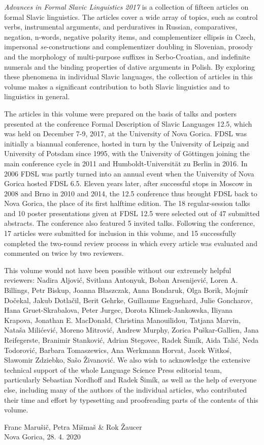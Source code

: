 
\textit{Advances in Formal Slavic Linguistics 2017} is a collection of fifteen articles on formal Slavic linguistics. The articles cover a wide array of topics, such as control verbs, instrumental arguments, and perduratives in Russian, comparatives, negation, n-words, negative polarity items, and complementizer ellipsis in Czech, impersonal \textit{se}-constructions and complementizer doubling in Slovenian, prosody and the morphology of multi-purpose suffixes in Serbo-Croatian, and indefinite numerals and the binding properties of dative arguments in Polish. By exploring these phenomena in individual Slavic languages, the collection of articles in this volume makes a significant contribution to both Slavic linguistics and to linguistics in general.

The articles in this volume were prepared on the basis of talks and posters presented at the conference Formal Description of Slavic Languages 12.5, which was held on December 7-9, 2017, at the University of Nova Gorica. FDSL was initially a biannual conference, hosted in turn by the University of Leipzig and University of Potsdam since 1995, with the University of Göttingen joining the main conference cycle in 2011 and Humboldt-Universität zu Berlin in 2016. In 2006 FDSL was partly turned into an annual event when the University of Nova Gorica hosted FDSL 6.5. Eleven years later, after successful stops in Moscow in 2008 and Brno in 2010 and 2014, the 12.5 conference thus brought FDSL back to Nova Gorica, the place of its first halftime edition. The 18 regular-session talks and 10 poster presentations given at FDSL 12.5 were selected out of 47 submitted abstracts. The conference also featured 5 invited talks. Following the conference, 17 articles were submitted for inclusion in this volume, and 15 successfully completed the two-round review process in which every article was evaluated and commented on twice by two reviewers.

This volume would not have been possible without our extremely helpful reviewers: Nadira Aljović, Svitlana Antonyuk, Boban Arsenijević, Loren A. Billings, Petr Biskup, Joanna Błaszczak, Anna Bondaruk, Olga Borik, Mojmír Dočekal, Jakub Dotlačil, Berit Gehrke, Guillaume Enguehard, Julie Goncharov, Hana Gruet-Skrabalova, Peter Jurgec, Dorota Klimek-Jankowska, Iliyana Krapova, Jonathan E. MacDonald, Christina Manouilidou, Tatjana Marvin, Nataša Milićević, Moreno Mitrović, Andrew Murphy, Zorica Puškar-Gallien, Jana Reifegerste, Branimir Stan\-ković, Adrian Stegovec, Radek Šimík, Aida Talić, Neda Todorović, Barbara To\-ma\-sze\-wics, Ana Werkmann Horvat, Jacek Witkoś, Sławomir Zdziebko, Sašo Živanović. We also wish to acknowledge the extensive technical support of the whole Language Science Press editorial team, particularly Sebastian Nordhoff and Radek Šimík, as well as the help of everyone else, including many of the authors of the individual articles, who contributed their time and effort by typesetting and proofreading parts of the contents of this volume.

\begin{flushright}Franc Marušič, Petra Mišmaš \& Rok Žaucer\\
Nova Gorica, 28. 4. 2020
\end{flushright}

